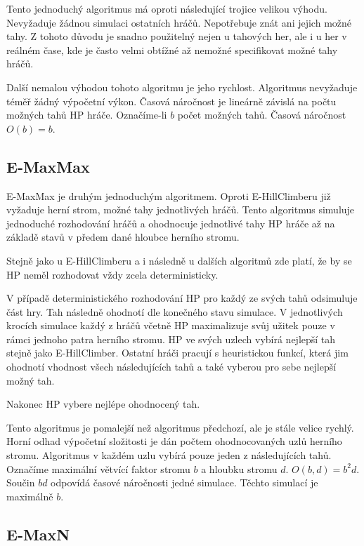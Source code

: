Tento jednoduchý algoritmus má oproti následující trojice velikou výhodu. Nevyžaduje žádnou simulaci ostatních hráčů. Nepotřebuje znát ani jejich možné tahy. Z tohoto důvodu je snadno použitelný nejen u tahových her, ale i u her v reálném čase, kde je často velmi obtížné až nemožné specifikovat možné tahy hráčů.

Další nemalou výhodou tohoto algoritmu je jeho rychlost. Algoritmus nevyžaduje téměř žádný výpočetní výkon. Časová náročnost je lineárně závislá na počtu možných tahů HP hráče. Označíme-li $b$ počet možných tahů. Časová náročnost $O(b) = b$.

\subsection{E-MaxMax}

E-MaxMax je druhým jednoduchým algoritmem. Oproti E-HillClimberu již vyžaduje herní strom, možné tahy jednotlivých hráčů. Tento algoritmus simuluje jednoduché rozhodování hráčů a ohodnocuje jednotlivé tahy HP hráče až na základě stavů v předem dané hloubce herního stromu.

Stejně jako u E-HillClimberu a i následně u dalších algoritmů zde platí, že by se HP neměl rozhodovat vždy zcela deterministicky.

V případě deterministického rozhodování HP pro každý ze svých tahů odsimuluje část hry. Tah následně ohodnotí dle konečného stavu simulace. V jednotlivých krocích simulace každý z hráčů včetně HP maximalizuje svůj užitek pouze v rámci jednoho patra herního stromu. HP ve svých uzlech vybírá nejlepší tah stejně jako E-HillClimber. Ostatní hráči pracují s heuristickou funkcí, která jim ohodnotí vhodnost všech následujících tahů a také vyberou pro sebe nejlepší možný tah.

Nakonec HP vybere nejlépe ohodnocený tah.

Tento algoritmus je pomalejší než algoritmus předchozí, ale je stále velice rychlý. Horní odhad výpočetní složitosti je dán počtem ohodnocovaných uzlů herního stromu. Algoritmus v každém uzlu vybírá pouze jeden z následujících tahů. Označíme maximální větvící faktor stromu $b$ a hloubku stromu $d$. $O(b, d) = b^2d$. Součin $bd$ odpovídá časové náročnosti jedné simulace. Těchto simulací je maximálně $b$.

\subsection{E-MaxN}
 
